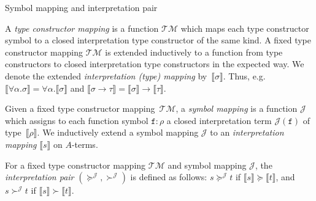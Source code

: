 \documentclass[10pt,presentation,color=names]{beamer}
\newcommand{\arrtype}{\rightarrow}
\newcommand{\quant}[2]{\forall #1.#2}
\newcommand{\typeinterpret}[1]{\llbracket #1 \rrbracket}
\newcommand{\interpret}[1]{\llbracket #1 \rrbracket}
\newcommand{\Typemap}{\mathcal{T\!M}}
\newcommand{\Termmap}{\mathcal{J}}
\newcommand{\succinterpret}{\succ^{\Termmap}}
\newcommand{\succeqinterpret}{\succeq^{\Termmap}}
\begin{document}
\begin{frame}{Symbol mapping and interpretation pair}
  \begin{definition}
    A \emph{type constructor mapping} is a function $\Typemap$ which
    maps each type constructor symbol to a closed interpretation type
    constructor of the same kind. A fixed type constructor mapping
    $\Typemap$ is extended inductively to a function from type
    constructors to closed interpretation type constructors in the
    expected way. We denote the extended \emph{interpretation (type)
      mapping} by~$\typeinterpret{\sigma}$. Thus,
    e.g.~$\typeinterpret{\quant{\alpha}{\sigma}} =
    \quant{\alpha}{\typeinterpret{\sigma}}$ and $\typeinterpret{\sigma
      \arrtype \tau} = \typeinterpret{\sigma} \arrtype
    \typeinterpret{\tau}$.
  \end{definition}

  \begin{definition}
    Given a fixed type constructor mapping~$\Typemap$, a \emph{symbol
      mapping} is a function $\Termmap$ which assigns to each function
    symbol $\mathtt{f} : \rho$ a closed interpretation term
    $\Termmap(\mathtt{f})$ of type~$\typeinterpret{\rho}$. We inductively extend a
    symbol mapping $\Termmap$ to an \emph{interpretation
      mapping} $\interpret{s}$ on $A$-terms.
  \end{definition}

  \begin{definition}
    For a fixed type constructor mapping $\Typemap$ and symbol mapping
    $\Termmap$, the \emph{interpretation pair}
    $(\succeqinterpret,\succinterpret)$ is defined as follows: $s
    \succeqinterpret t$ if $\interpret{s} \succeq \interpret{t}$, and $s
    \succinterpret t$ if $\interpret{s} \succ \interpret{t}$.
  \end{definition}
\end{frame}
\end{document}
